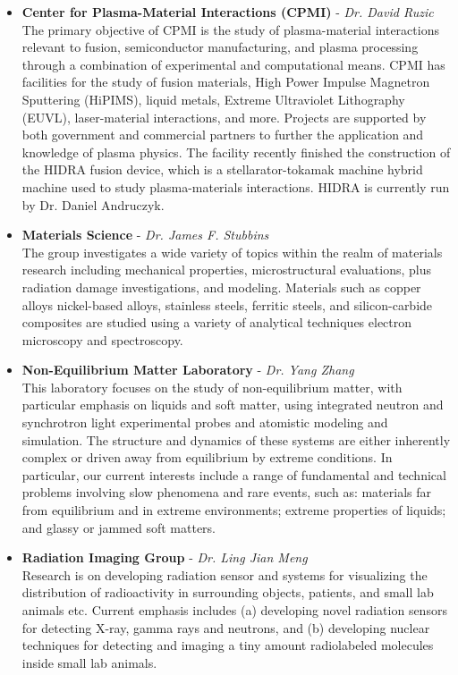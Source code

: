 \documentclass[12pt, letterpaper]{article}
\begin{document}
\begin{itemize}
  \item \textbf{Center for Plasma-Material Interactions (CPMI)} - \textit{Dr. David Ruzic}\\
  The primary objective of CPMI is the study of plasma-material interactions relevant to fusion, semiconductor manufacturing, and plasma processing through a combination of experimental and computational means. CPMI has facilities for the study of fusion materials, High Power Impulse Magnetron Sputtering (HiPIMS), liquid metals, Extreme Ultraviolet Lithography (EUVL),  laser-material interactions, and more. Projects are supported by both government and commercial partners to further the application and knowledge of plasma physics. The facility recently finished the construction of the HIDRA fusion device, which is a stellarator-tokamak machine hybrid machine used to study plasma-materials interactions.  HIDRA is currently run by Dr. Daniel Andruczyk.

  \item \textbf{Materials Science} - \textit{Dr. James F. Stubbins}\\
  The group investigates a wide variety of topics within the realm of materials research including mechanical properties, microstructural evaluations, plus radiation damage investigations, and modeling. Materials such as copper alloys nickel-based alloys, stainless steels, ferritic steels, and silicon-carbide composites are studied using a variety of analytical techniques electron microscopy and spectroscopy.


  \item \textbf{Non-Equilibrium Matter Laboratory} - \textit{Dr. Yang Zhang}\\
  This laboratory focuses on the study of non-equilibrium matter, with particular emphasis on liquids and soft matter, using integrated neutron and synchrotron light experimental probes and atomistic modeling and simulation. The structure and dynamics of these systems are either inherently complex or driven away from equilibrium by extreme conditions. In particular, our current interests include a range of fundamental and technical problems involving slow phenomena and rare events, such as: materials far from equilibrium and in extreme environments; extreme properties of liquids; and glassy or jammed soft matters.

  \item \textbf{Radiation Imaging Group} - \textit{Dr. Ling Jian Meng}\\
  Research is on developing radiation sensor and systems for visualizing the distribution of radioactivity in surrounding objects, patients, and small lab animals etc. Current emphasis includes (a) developing novel radiation sensors for detecting X-ray, gamma rays and neutrons, and (b) developing nuclear techniques for detecting and imaging a tiny amount radiolabeled molecules inside small lab animals.


\end{itemize}
\end{document}
